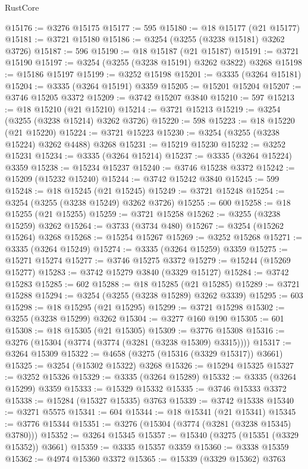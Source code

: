 \begin{lexlean}{RustCore}
\begin{coremodule}
@15176 := @3276 @15175
@15177 := 595
@15180 := @18 @15177 (@21 @15177)
@15181 := @3721 @15180
@15186 := @3254 (@3255 (@3238 @15181) @3262 @3726)
@15187 := 596
@15190 := @18 @15187 (@21 @15187)
@15191 := @3721 @15190
@15197 := @3254 (@3255 (@3238 @15191) @3262 @3822) @3268
@15198 := @15186 @15197
@15199 := @3252 @15198
@15201 := @3335 (@3264 @15181)
@15204 := @3335 (@3264 @15191) @3359
@15205 := @15201 @15204
@15207 := @3746 @15205 @3372
@15209 := @3742 @15207 @3840
@15210 := 597
@15213 := @18 @15210 (@21 @15210)
@15214 := @3721 @15213
@15219 := @3254 (@3255 (@3238 @15214) @3262 @3726)
@15220 := 598
@15223 := @18 @15220 (@21 @15220)
@15224 := @3721 @15223
@15230 := @3254 (@3255 (@3238 @15224) @3262 @4488) @3268
@15231 := @15219 @15230
@15232 := @3252 @15231
@15234 := @3335 (@3264 @15214)
@15237 := @3335 (@3264 @15224) @3359
@15238 := @15234 @15237
@15240 := @3746 @15238 @3372
@15242 := @15209 (@15232 @15240)
@15244 := @3742 @15242 @3840
@15245 := 599
@15248 := @18 @15245 (@21 @15245)
@15249 := @3721 @15248
@15254 := @3254 (@3255 (@3238 @15249) @3262 @3726)
@15255 := 600
@15258 := @18 @15255 (@21 @15255)
@15259 := @3721 @15258
@15262 := @3255 (@3238 @15259) @3262
@15264 := @3733 (@3734 @480)
@15267 := @3254 (@15262 @15264) @3268
@15268 := @15254 @15267
@15269 := @3252 @15268
@15271 := @3335 (@3264 @15249)
@15274 := @3335 (@3264 @15259) @3359
@15275 := @15271 @15274
@15277 := @3746 @15275 @3372
@15279 := @15244 (@15269 @15277)
@15283 := @3742 @15279 @3840 (@3329 @15127)
@15284 := @3742 @15283
@15285 := 602
@15288 := @18 @15285 (@21 @15285)
@15289 := @3721 @15288
@15294 := @3254 (@3255 (@3238 @15289) @3262 @3339)
@15295 := 603
@15298 := @18 @15295 (@21 @15295)
@15299 := @3721 @15298
@15302 := @3255 (@3238 @15299) @3262
@15304 := @3277 @160 @190
@15305 := 601
@15308 := @18 @15305 (@21 @15305)
@15309 := @3776 @15308
@15316 := @3276 (@15304 (@3774 (@3774 (@3281 (@3238 @15309) @3315))))
@15317 := @3264 @15309
@15322 := @4658 (@3275 (@15316 (@3329 @15317)) @3661)
@15325 := @3254 (@15302 @15322) @3268
@15326 := @15294 @15325
@15327 := @3252 @15326
@15329 := @3335 (@3264 @15289)
@15332 := @3335 (@3264 @15299) @3359
@15333 := @15329 @15332
@15335 := @3746 @15333 @3372
@15338 := @15284 (@15327 @15335) @3763
@15339 := @3742 @15338
@15340 := @3271 @5575
@15341 := 604
@15344 := @18 @15341 (@21 @15341)
@15345 := @3776 @15344
@15351 := @3276 (@15304 (@3774 (@3281 (@3238 @15345) @3780)))
@15352 := @3264 @15345
@15357 := @15340 (@3275 (@15351 (@3329 @15352)) @3661)
@15359 := @3335 @15357 @3359
@15360 := @3338 @15359
@15362 := @4974 @15360 @3372
@15365 := @15339 (@3329 @15362) @3763

\end{coremodule}
\end{lexlean}
